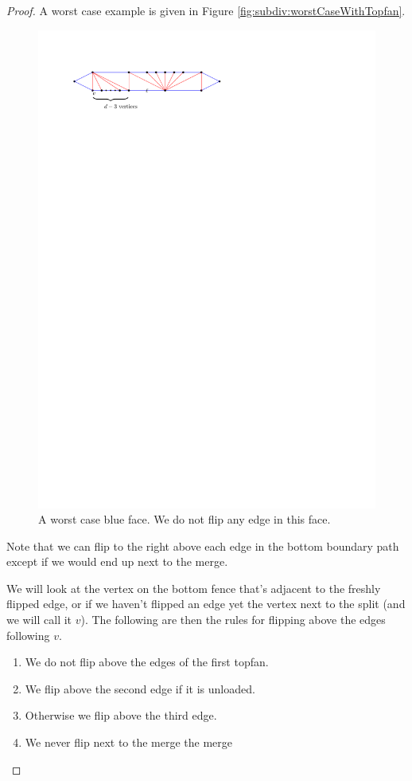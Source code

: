   \begin{proof}
  A worst case example is given in Figure \ref{fig:subdiv:worstCaseWithTopfan}.

  \begin{figure}[h]
    \centering
    \includegraphics[scale=1]{blueFaceSubdivision/img/worstCaseWithTopFan}
    \caption{A worst case blue face. We do not flip any edge in this face.}
    \label{fig:subdiv:worstCaseWithTopFan}
  \end{figure}

  Note that we can flip to the right above each edge in the bottom boundary path except if we would end up next to the merge.

  We will look at the vertex on the bottom fence that's adjacent to the freshly flipped edge, or if we haven't flipped an edge yet the vertex next to the split (and we will call it $v$). The following are then the rules for flipping above the edges following $v$.
  \begin{enumerate}
    \item We do not flip above the edges of the first topfan.
    \item We flip above the second edge if it is unloaded.
    \item Otherwise we flip above the third edge.
    \item We never flip next to the merge the merge
  \end{enumerate}


\end{proof}
